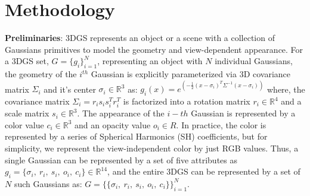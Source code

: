 \vspace{-0.15cm}
\section{Methodology}

\noindent\textbf{Preliminaries}:
3DGS represents an object or a scene with a collection of Gaussians primitives to model the geometry and view-dependent appearance. 
For a 3DGS set, \(G =\{g_i\}_{i=1}^N\), representing an object with $N$ individual Gaussians, the geometry of the $i^{th}$ Gaussian is explicitly parameterized via 3D covariance matrix $\Sigma_i$ and it's center $\sigma_i \in \mathbb{R}^3$ as:
\setlength{\abovedisplayskip}{3pt}
\setlength{\belowdisplayskip}{3pt}
$
    g_i(x) = e^{(-\frac{1}{2} (x - \sigma_i)^T \Sigma^{-1} (x - \sigma_i))}
$
where, the covariance matrix $\Sigma_i = r_i s_i s_i^T r_i^T$ is factorized into a rotation matrix $r_i \in \mathbb{R}^4$ and a scale matrix $s_i \in \mathbb{R}^3$. 
The appearance of the $i-th$ Gaussian is represented by a color value $c_i \in \mathbb{R}^3$ and an opacity value $o_i \in R$. 
In practice, the color is represented by a series of Spherical Harmonics (SH) coefficients, but for simplicity, we represent the view-independent color by just RGB values. 
Thus, a single Gaussian can be represented by a set of five attributes as $ g_i = \{ \sigma_i, ~r_i, ~s_i, ~o_i, ~c_i \} \in \mathbb{R}^{14}$, and the entire 3DGS can be represented by a set of $N$ such Gaussians as:
$G = \{ \{ \sigma_i, ~r_i, ~s_i, ~o_i, ~c_i \} \}_{i=1}^N$.

